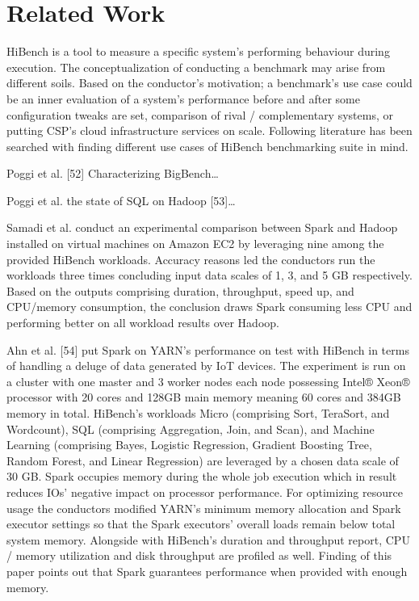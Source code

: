 \documentclass[review]{elsarticle}
\begin{document}
\section{Related Work}
HiBench is a tool to measure a specific system’s performing behaviour during execution. The conceptualization of conducting a benchmark may arise from different soils. Based on the conductor’s motivation; a benchmark’s use case could be an inner evaluation of a system’s performance before and after some configuration tweaks are set, comparison of rival / complementary systems, or putting CSP’s cloud infrastructure services on scale. Following literature has been searched with finding different use cases of HiBench benchmarking suite in mind. 

Poggi et al. [52] Characterizing BigBench…

Poggi et al. the state of SQL on Hadoop [53]…

Samadi et al. conduct an experimental comparison between Spark and Hadoop installed on virtual machines on Amazon EC2 by leveraging nine among the provided HiBench workloads. Accuracy reasons led the conductors run the workloads three times concluding input data scales of 1, 3, and 5 GB respectively. Based on the outputs comprising duration, throughput, speed up, and CPU/memory consumption, the conclusion draws Spark consuming less CPU and performing better on all workload results over Hadoop. 

Ahn et al. [54] put Spark on YARN’s performance on test with HiBench in terms of handling a deluge of data generated by IoT devices. The experiment is run on a cluster with one master and 3 worker nodes each node possessing Intel® Xeon® processor with 20 cores and 128GB main memory meaning 60 cores and 384GB memory in total. HiBench’s workloads Micro (comprising Sort, TeraSort, and Wordcount), SQL (comprising Aggregation, Join, and Scan), and Machine Learning (comprising Bayes, Logistic Regression, Gradient Boosting Tree, Random Forest, and Linear Regression) are leveraged by a chosen data scale of 30 GB. Spark occupies memory during the whole job execution which in result reduces IOs’ negative impact on processor performance. For optimizing resource usage the conductors modified YARN’s minimum memory allocation and Spark executor settings so that the Spark executors’ overall loads remain below total system memory. Alongside with HiBench’s duration and throughput report, CPU / memory utilization and disk throughput are profiled as well. Finding of this paper points out that Spark guarantees performance when provided with enough memory.
\end{document}
